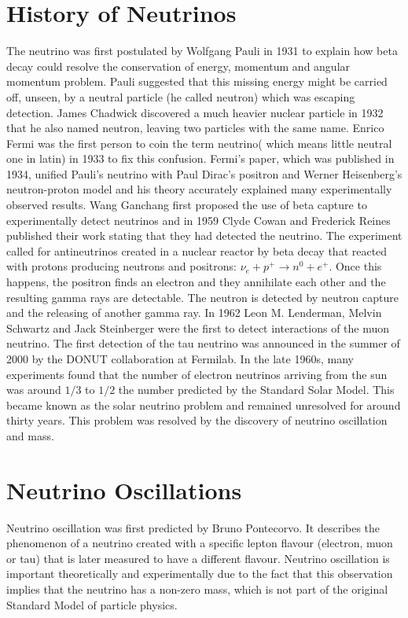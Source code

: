 \section{History of Neutrinos}
The neutrino was first postulated by Wolfgang Pauli in 1931 to explain how beta decay could resolve the conservation of energy, momentum and angular momentum problem. Pauli suggested that this missing energy might be carried off, unseen, by a neutral particle (he called neutron) which was escaping detection. James Chadwick discovered a much heavier nuclear particle in 1932 that he also named neutron, leaving two particles with the same name. Enrico Fermi was the first person to coin the term neutrino( which means little neutral one in latin) in 1933 to fix this confusion. Fermi's paper, which was published in 1934, unified Pauli's neutrino with Paul Dirac's positron and Werner Heisenberg's neutron-proton model and his theory accurately explained many experimentally observed results. Wang Ganchang first proposed the use of beta capture to experimentally detect neutrinos and in 1959 Clyde Cowan and Frederick Reines published their work stating that they had detected the neutrino. The experiment called for antineutrinos created in a nuclear reactor by beta decay that reacted with protons producing neutrons and positrons: $\nu_{e} +p^{+}\rightarrow n^{0} + e^{+}$. Once this happens, the positron finds an electron and they annihilate each other and the resulting gamma rays are detectable. The neutron is detected by neutron capture and the releasing of another gamma ray. In 1962 Leon M. Lenderman, Melvin Schwartz and Jack Steinberger were the first to detect interactions of the muon neutrino. The first detection of the tau neutrino was announced in the summer of 2000 by the DONUT collaboration at Fermilab. In the late 1960s, many experiments found that the number of electron neutrinos arriving from the sun was around $1/3$ to $1/2$ the number predicted by the Standard Solar Model. This became known as the solar neutrino problem and remained unresolved for around thirty years. This problem was resolved by the discovery of neutrino oscillation and mass.\cite{neutrino}


\section{Neutrino Oscillations}
Neutrino oscillation was first predicted by Bruno Pontecorvo. It describes the phenomenon of a neutrino created with a specific lepton flavour (electron, muon or tau) that is later measured to have a different flavour. Neutrino oscillation is important theoretically and experimentally due to the fact that this observation implies that the neutrino has a non-zero mass, which is not part of the original Standard Model of particle physics. \cite{neutrinooscillation} 

